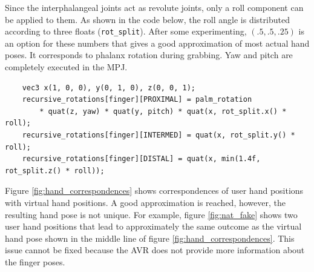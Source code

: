 \documentclass[hyperref, bachelorofscience]{cgvpub}
\begin{document}
Since the interphalangeal joints act as revolute joints, only a roll component can be applied to them. As shown in the code below, the roll angle is distributed according to three floats (\lstinline|rot_split|). After some experimenting, $ (.5, .5, .25) $ is an option for these numbers that gives a good approximation of most actual hand poses. It corresponds to phalanx rotation during grabbing. Yaw and pitch are completely executed in the \gls{MPJ}. 
\begin{lstlisting}
	vec3 x(1, 0, 0), y(0, 1, 0), z(0, 0, 1);
	recursive_rotations[finger][PROXIMAL] = palm_rotation
		* quat(z, yaw) * quat(y, pitch) * quat(x, rot_split.x() * roll);
	recursive_rotations[finger][INTERMED] = quat(x, rot_split.y() * roll);
	recursive_rotations[finger][DISTAL] = quat(x, min(1.4f, rot_split.z() * roll));
\end{lstlisting}

Figure \ref{fig:hand_correspondences} shows correspondences of user hand positions with virtual hand positions. A good approximation is reached, however, the resulting hand pose is not unique. For example, figure \ref{fig:nat_fake} shows two user hand positions that lead to approximately the same outcome as the virtual hand pose shown in the middle line of figure \ref{fig:hand_correspondences}. This issue cannot be fixed because the \Gls{AVR} does not provide more information about the finger poses.
\end{document}
